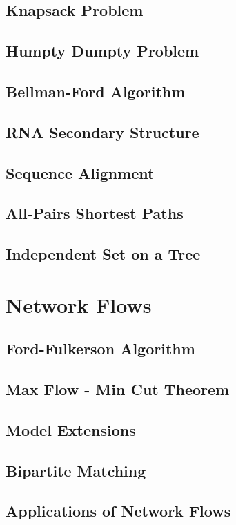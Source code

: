 \documentclass{article}
\begin{document}
\subsection{Knapsack Problem}
\subsection{Humpty Dumpty Problem}
\subsection{Bellman-Ford Algorithm}
\subsection{RNA Secondary Structure}
\subsection{Sequence Alignment}
\subsection{All-Pairs Shortest Paths}
\subsection{Independent Set on a Tree}
\newpage


\section{Network Flows}
\subsection{Ford-Fulkerson Algorithm}
\subsection{Max Flow - Min Cut Theorem}
\subsection{Model Extensions}
\subsection{Bipartite Matching}
\subsection{Applications of Network Flows}
\end{document}
